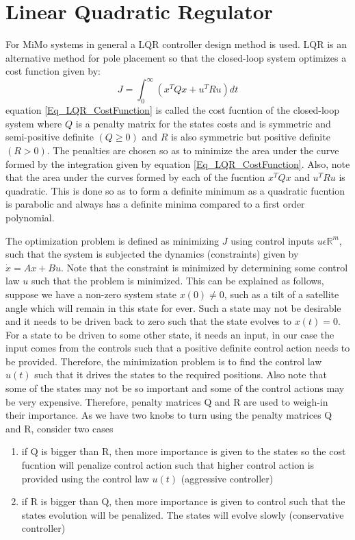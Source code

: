 \section{Linear Quadratic Regulator}

For MiMo systems in general a LQR controller design method is used. LQR is an alternative method for pole placement so that the closed-loop system optimizes a cost function given by:
\begin{equation} \label{Eq_LQR_CostFunction}
	J = \int_{0}^{\infty} \left(x^{T} Q x + u^{T} R u\right) dt
\end{equation}
equation \eqref{Eq_LQR_CostFunction} is called the cost fucntion of the closed-loop system where $Q$ is a penalty matrix for the states costs and is symmetric and semi-positive definite $(Q \geq 0)$ and $R$ is also symmetric but positive definite $(R > 0)$. The penalties are chosen so as to minimize the area under the curve formed by the integration given by equation \eqref{Eq_LQR_CostFunction}. Also, note that the area under the curves formed by each of the fucntion $x^{T} Q x$ and $u^{T} R u$ is quadratic. This is done so as to form a definite minimum as a quadratic fucntion is parabolic and always has a definite minima compared to a first order polynomial.

The optimization problem is defined as minimizing $J$ using control inputs $u \epsilon \mathbb{R}^{m}$, such that the system is subjected the dynamics (constraints) given by $\dot{x} = Ax + Bu$. Note that the constraint is minimized by determining some control law $u$ such that the problem is minimized. This can be explained as follows, suppose we have a non-zero system state $x(0) \neq 0$, such as a tilt of a satellite angle which will remain in this state for ever. Such a state may not be desirable and it needs to be driven back to zero such that the state evolves to $x(t) = 0$. For a state to be driven to some other state, it needs an input, in our case the input comes from the controls such that a positive definite control action needs to be provided. Therefore, the minimization problem is to find the control law $u(t)$ such that it drives the states to the required positions. Also note that some of the states may not be so important and some of the control actions may be very expensive. Therefore, penalty matrices Q and R are used to weigh-in their importance. As we have two knobs to turn using the penalty matrices Q and R, consider two cases
\begin{enumerate}
	\item if Q is bigger than R, then more importance is given to the states so the cost fucntion will penalize control action such that higher control action is provided using the control law $u(t)$ (aggressive controller)
	\item if R is bigger than Q, then more importance is given to control such that the states evolution will be penalized. The states will evolve slowly (conservative controller)
\end{enumerate}

